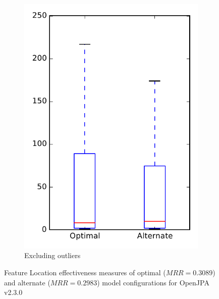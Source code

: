 \begin{figure}
\begin{subfigure}{.4\textwidth}
        \includegraphics[height=0.4\textheight]{figures/combo/flt_rq1_openjpa_no_outlier}
        \caption{Excluding outliers}\label{fig:combo:flt:rq1:openjpa_no_outlier}
    \end{subfigure}
\caption[Feature Location effectiveness measures of optimal and alternate model configurations for OpenJPA v2.3.0]%
{Feature Location effectiveness measures of optimal ($MRR=0.3089$) and alternate ($MRR=0.2983$) model configurations for OpenJPA v2.3.0}
\label{fig:combo:flt:rq1:openjpa}
\end{figure}
